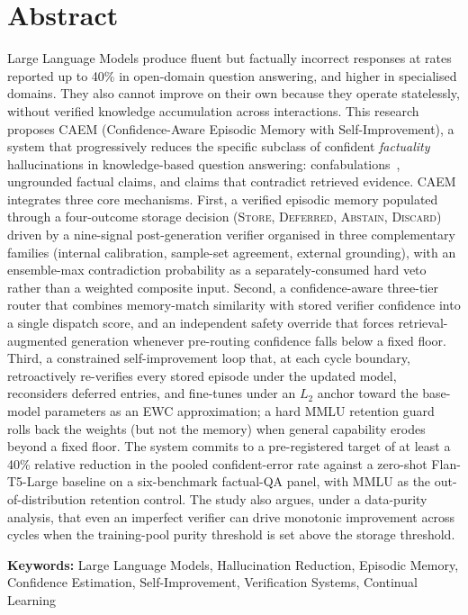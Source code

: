 \chapter*{Abstract}
Large Language Models produce fluent but factually incorrect responses at rates reported up to 40\% in open-domain question answering, and higher in specialised domains. They also cannot improve on their own because they operate statelessly, without verified knowledge accumulation across interactions. This research proposes CAEM (Confidence-Aware Episodic Memory with Self-Improvement), a system that progressively reduces the specific subclass of confident \textit{factuality} hallucinations in knowledge-based question answering: confabulations~\cite{farquhar2024semantic}, ungrounded factual claims, and claims that contradict retrieved evidence. CAEM integrates three core mechanisms. First, a verified episodic memory populated through a four-outcome storage decision (\textsc{Store}, \textsc{Deferred}, \textsc{Abstain}, \textsc{Discard}) driven by a nine-signal post-generation verifier organised in three complementary families (internal calibration, sample-set agreement, external grounding), with an ensemble-max contradiction probability as a separately-consumed hard veto rather than a weighted composite input. Second, a confidence-aware three-tier router that combines memory-match similarity with stored verifier confidence into a single dispatch score, and an independent safety override that forces retrieval-augmented generation whenever pre-routing confidence falls below a fixed floor. Third, a constrained self-improvement loop that, at each cycle boundary, retroactively re-verifies every stored episode under the updated model, reconsiders deferred entries, and fine-tunes under an $L_2$ anchor toward the base-model parameters as an EWC approximation; a hard MMLU retention guard rolls back the weights (but not the memory) when general capability erodes beyond a fixed floor. The system commits to a pre-registered target of at least a 40\% relative reduction in the pooled confident-error rate against a zero-shot Flan-T5-Large baseline on a six-benchmark factual-QA panel, with MMLU as the out-of-distribution retention control. The study also argues, under a data-purity analysis, that even an imperfect verifier can drive monotonic improvement across cycles when the training-pool purity threshold is set above the storage threshold.


\vspace{0.5cm}

\noindent\textbf{Keywords:} Large Language Models, Hallucination Reduction, Episodic Memory, Confidence Estimation, Self-Improvement, Verification Systems, Continual Learning
